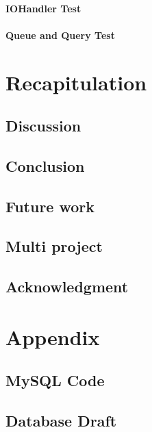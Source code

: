       \subsubsection{IOHandler Test}
      
      \subsubsection{Queue and Query Test}
      

\chapter{Recapitulation}
\label{recap}
  \section{Discussion}
    \label{sect:disc}
    
  
  \section{Conclusion}
    
  \section{Future work}
  	
  \section{Multi project} %
  	
  \section{Acknowledgment}
  	


\appendix
    \chapter{Appendix}
    \section{MySQL Code}
    \label{MySQLcode}
      
    \section{Database Draft}
      \label{sec:Databasedrafts}
      
